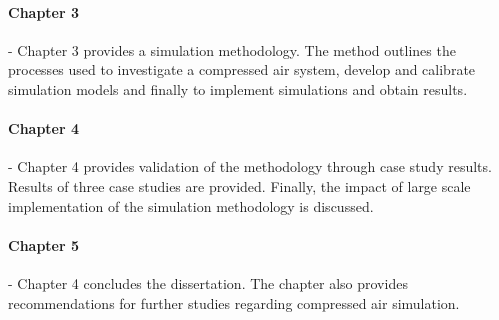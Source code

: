 	\paragraph{Chapter 3} \hspace{0.4cm} - \hspace{0.05cm} Chapter 3 provides a simulation methodology. The method outlines the processes used to investigate a compressed air system, develop and calibrate simulation models and finally to implement simulations and obtain results.
	\paragraph{Chapter 4} \hspace{0.4cm} - \hspace{0.05cm} Chapter 4 provides validation of the methodology through case study results. Results of three case studies are provided. Finally, the impact of large scale implementation of the simulation methodology is discussed.
	\paragraph{Chapter 5} \hspace{0.4cm} - \hspace{0.05cm} Chapter 4 concludes the dissertation. The chapter also provides recommendations for further studies regarding compressed air simulation.
